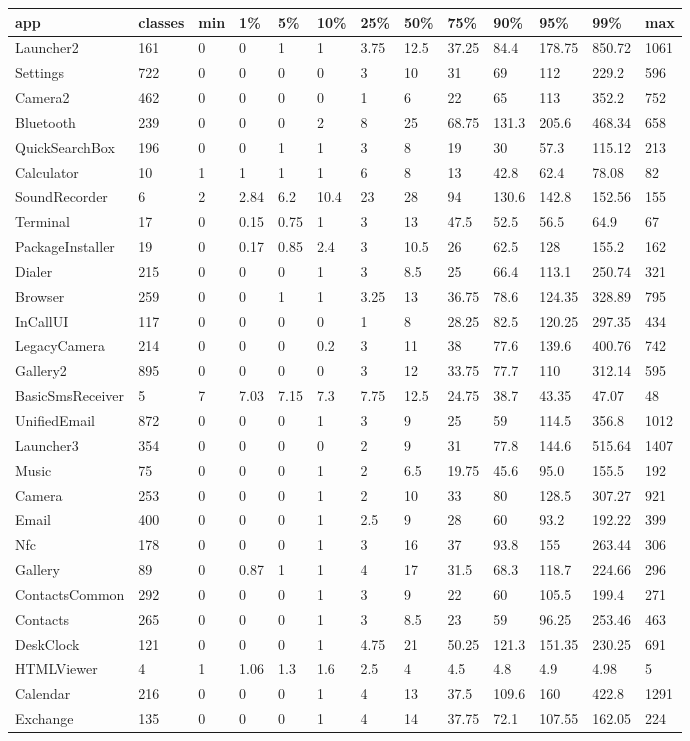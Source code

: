 \begin{tabular}{|l|l|l|l|l|l|l|l|l|l|l|l|l|}
\hline
app&classes&min&1\%&5\%&10\%&25\%&50\%&75\%&90\%&95\%&99\%&max\\
\hline
Launcher2&161&0&0&1&1&3.75&12.5&37.25&84.4&178.75&850.72&1061\\
\hline
Settings&722&0&0&0&0&3&10&31&69&112&229.2&596\\
\hline
Camera2&462&0&0&0&0&1&6&22&65&113&352.2&752\\
\hline
Bluetooth&239&0&0&0&2&8&25&68.75&131.3&205.6&468.34&658\\
\hline
QuickSearchBox&196&0&0&1&1&3&8&19&30&57.3&115.12&213\\
\hline
Calculator&10&1&1&1&1&6&8&13&42.8&62.4&78.08&82\\
\hline
SoundRecorder&6&2&2.84&6.2&10.4&23&28&94&130.6&142.8&152.56&155\\
\hline
Terminal&17&0&0.15&0.75&1&3&13&47.5&52.5&56.5&64.9&67\\
\hline
PackageInstaller&19&0&0.17&0.85&2.4&3&10.5&26&62.5&128&155.2&162\\
\hline
Dialer&215&0&0&0&1&3&8.5&25&66.4&113.1&250.74&321\\
\hline
Browser&259&0&0&1&1&3.25&13&36.75&78.6&124.35&328.89&795\\
\hline
InCallUI&117&0&0&0&0&1&8&28.25&82.5&120.25&297.35&434\\
\hline
LegacyCamera&214&0&0&0&0.2&3&11&38&77.6&139.6&400.76&742\\
\hline
Gallery2&895&0&0&0&0&3&12&33.75&77.7&110&312.14&595\\
\hline
BasicSmsReceiver&5&7&7.03&7.15&7.3&7.75&12.5&24.75&38.7&43.35&47.07&48\\
\hline
UnifiedEmail&872&0&0&0&1&3&9&25&59&114.5&356.8&1012\\
\hline
Launcher3&354&0&0&0&0&2&9&31&77.8&144.6&515.64&1407\\
\hline
Music&75&0&0&0&1&2&6.5&19.75&45.6&95.0&155.5&192\\
\hline
Camera&253&0&0&0&1&2&10&33&80&128.5&307.27&921\\
\hline
Email&400&0&0&0&1&2.5&9&28&60&93.2&192.22&399\\
\hline
Nfc&178&0&0&0&1&3&16&37&93.8&155&263.44&306\\
\hline
Gallery&89&0&0.87&1&1&4&17&31.5&68.3&118.7&224.66&296\\
\hline
ContactsCommon&292&0&0&0&1&3&9&22&60&105.5&199.4&271\\
\hline
Contacts&265&0&0&0&1&3&8.5&23&59&96.25&253.46&463\\
\hline
DeskClock&121&0&0&0&1&4.75&21&50.25&121.3&151.35&230.25&691\\
\hline
HTMLViewer&4&1&1.06&1.3&1.6&2.5&4&4.5&4.8&4.9&4.98&5\\
\hline
Calendar&216&0&0&0&1&4&13&37.5&109.6&160&422.8&1291\\
\hline
Exchange&135&0&0&0&1&4&14&37.75&72.1&107.55&162.05&224\\
\hline
\end{tabular}
